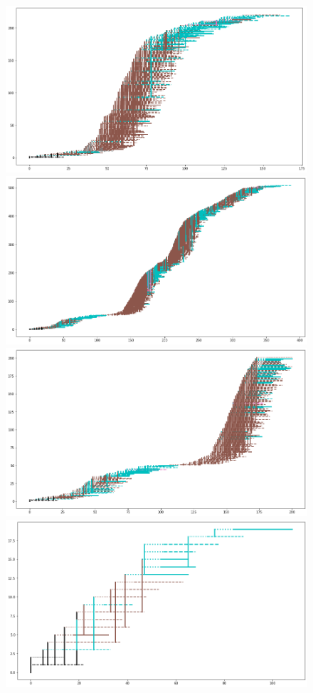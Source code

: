 \documentclass[11pt]{article}
\begin{document}
\begin{figure}[H]
\center
\includegraphics[scale=0.2]{withShort1.png}             \includegraphics[scale=0.2]{withShort1A.png} 
\center
\includegraphics[scale=0.2]{withShort1A200.png}     \includegraphics[scale=0.2]{withShort1B.png} \\

\end{figure}
\end{document}
